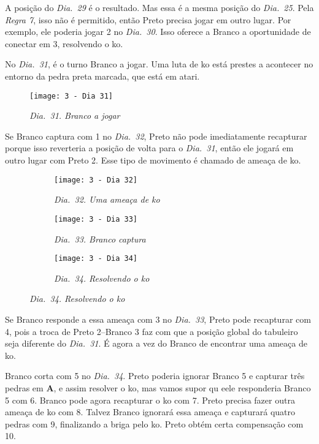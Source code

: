 A posição do \emph{Dia.\@~29} é o resultado. Mas essa é a mesma posição do \emph{Dia.\@~25}. Pela \emph{Regra 7}, isso não é permitido, então Preto precisa jogar em outro lugar. Por exemplo, ele poderia jogar 2 no \emph{Dia.\@~30}. Isso oferece a Branco a oportunidade de conectar em 3, resolvendo o ko.

No \emph{Dia.\@~31}, é o turno Branco a jogar. Uma luta de ko está prestes a acontecer no entorno da pedra preta marcada, que está em atari.

\begin{figure}[h]
  \begin{center}
      \texttt{[image: 3 - Dia 31]}
      \caption*{\emph{Dia.\@~31. Branco a jogar}}
  \end{center}
\end{figure}

\pagebreak

Se Branco captura com 1 no \emph{Dia.\@~32}, Preto não pode imediatamente recapturar porque isso reverteria a posição de volta para o \emph{Dia.\@~31}, então ele jogará em outro lugar com Preto 2. Esse tipo de movimento é chamado de ameaça de ko.

\begin{figure}[h]
  \centering
  \begin{subfigure}[t]{.3\textwidth}
      \centering
      \texttt{[image: 3 - Dia 32]}
      \caption*{\emph{Dia.\@~32. Uma ameaça de ko}}
  \end{subfigure}
  \begin{subfigure}[t]{.3\textwidth}
      \centering
      \texttt{[image: 3 - Dia 33]}
      \caption*{\emph{Dia.\@~33. Branco captura}}
  \end{subfigure}
  \begin{subfigure}[t]{.3\textwidth}
      \centering
      \texttt{[image: 3 - Dia 34]}
      \caption*{\emph{Dia.\@~34. Resolvendo o ko}}
  \end{subfigure}
\end{figure}

Se Branco responde a essa ameaça com 3 no \emph{Dia.\@~33}, Preto pode recapturar com 4, pois a troca de Preto 2--Branco 3 faz com que a posição global do tabuleiro seja diferente do \emph{Dia.\@~31}. É agora a vez do Branco de encontrar uma ameaça de ko.

Branco corta com 5 no \emph{Dia.\@~34}. Preto poderia ignorar Branco 5 e capturar três pedras em \textbf{A}, e assim  resolver o ko, mas vamos supor qu eele responderia Branco 5 com 6. Branco pode agora recapturar o ko com 7. Preto precisa fazer outra ameaça de ko com 8. Talvez Branco ignorará essa ameaça e capturará quatro pedras com 9, finalizando a briga pelo ko. Preto obtém certa compensação com 10.